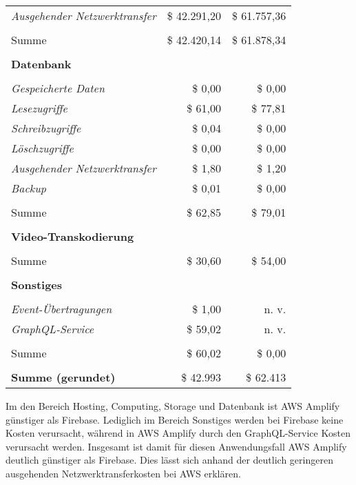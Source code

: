 \begin{table}[h]
\begin{footnotesize}
\begin{tabularx}{0.9\textwidth}{l r r}
      \emph{Ausgehender Netzwerktransfer} & \$ 42.291,20 & \$ 61.757,36 \\
       &  &  \\
      Summe & \$ 42.420,14 & \$ 61.878,34 \\
       &  &  \\
      \textbf{Datenbank} &  &  \\
       &  &  \\
      \emph{Gespeicherte Daten} & \$ 0,00 & \$ 0,00 \\
      \emph{Lesezugriffe} & \$ 61,00 & \$ 77,81 \\
      \emph{Schreibzugriffe} & \$ 0,04 & \$ 0,00 \\
      \emph{Löschzugriffe} & \$ 0,00 & \$ 0,00 \\
      \emph{Ausgehender Netzwerktransfer} & \$ 1,80 & \$ 1,20 \\
      \emph{Backup} & \$ 0,01 & \$ 0,00 \\
       &  &  \\
      Summe & \$ 62,85 & \$ 79,01 \\
       &  &  \\
      \textbf{Video-Transkodierung} &  &  \\
       &  &  \\
      Summe & \$ 30,60 & \$ 54,00 \\
       &  &  \\
      \textbf{Sonstiges} &  &  \\
      &  &  \\
      \emph{Event-Übertragungen} & \$ 1,00 & n. v. \\
      \emph{GraphQL-Service} & \$ 59,02 & n. v. \\
       &  &  \\
      Summe & \$ 60,02 & \$ 0,00 \\
       &  &  \\
      \textbf{Summe (gerundet)} & \$ 42.993 & \$ 62.413 \\
      \bottomrule
    \end{tabularx}
  \end{footnotesize}
  \rmfamily
\end{table}

Im den Bereich Hosting, Computing, Storage und Datenbank ist \ac{AWS} Amplify günstiger als Firebase. Lediglich im Bereich Sonstiges werden bei Firebase keine Kosten verursacht, während in \ac{AWS} Amplify durch den GraphQL-Service Kosten verursacht werden. Insgesamt ist damit für diesen Anwendungsfall \ac{AWS} Amplify deutlich günstiger als Firebase. Dies lässt sich anhand der deutlich geringeren ausgehenden Netzwerktransferkosten bei \ac{AWS} erklären.

